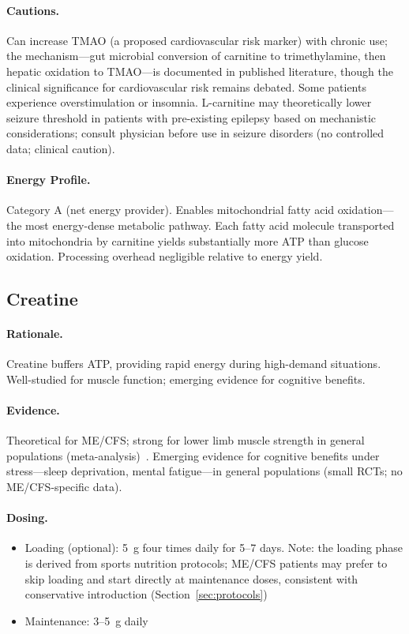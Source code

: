 \paragraph{Cautions.} Can increase TMAO (a proposed cardiovascular risk marker) with chronic use; the mechanism---gut microbial conversion of carnitine to trimethylamine, then hepatic oxidation to TMAO---is documented in published literature, though the clinical significance for cardiovascular risk remains debated. Some patients experience overstimulation or insomnia. L-carnitine may theoretically lower seizure threshold in patients with pre-existing epilepsy based on mechanistic considerations; consult physician before use in seizure disorders (no controlled data; clinical caution).

\paragraph{Energy Profile.}
Category A (net energy provider). Enables mitochondrial fatty acid oxidation---the most energy-dense metabolic pathway. Each fatty acid molecule transported into mitochondria by carnitine yields substantially more ATP than glucose oxidation. Processing overhead negligible relative to energy yield.

\subsection{Creatine}

\paragraph{Rationale.} Creatine buffers ATP, providing rapid energy during high-demand situations. Well-studied for muscle function; emerging evidence for cognitive benefits.

\paragraph{Evidence.} Theoretical for ME/CFS; strong for lower limb muscle strength in general populations (meta-analysis)~\cite{Lanhers2015creatine}. Emerging evidence for cognitive benefits under stress---sleep deprivation, mental fatigue---in general populations (small RCTs; no ME/CFS-specific data).

\paragraph{Dosing.}
\begin{itemize}
    \item Loading (optional): 5~g four times daily for 5--7 days. Note: the loading phase is derived from sports nutrition protocols; ME/CFS patients may prefer to skip loading and start directly at maintenance doses, consistent with conservative introduction (Section~\ref{sec:protocols})
    \item Maintenance: 3--5~g daily
\end{itemize}


